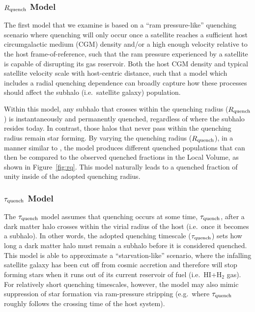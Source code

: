 \subsubsection{$R_{\rm quench}$ Model}
\label{subsubsec:rps}

The first model that we examine is based on a ``ram pressure-like'' quenching
scenario where quenching will only occur once a satellite reaches a sufficient
host circumgalactic medium (CGM) density and/or a high enough velocity relative
to the host frame-of-reference, such that the ram pressure experienced by a
satellite is capable of disrupting its gas reservoir.
%
Both the host CGM density and typical satellite velocity scale with host-centric
distance, such that a model which includes a radial quenching dependence can
broadly capture how these processes should affect the subhalo (i.e.~satellite
galaxy) population.
%




Within this model, any subhalo that crosses within the quenching radius
($R_{\rm quench}$) is instantaneously and permanently quenched, regardless of
where the subhalo resides today.
%
In contrast, those halos that never pass within the quenching radius remain
star forming.
%
By varying the quenching radius ($R_{\rm quench}$), in a manner similar to
\citet{fham15}, the model produces different quenched populations that can then
be compared to the observed quenched fractions in the Local Volume, as shown in
Figure~\ref{fig:rq}.
%
This model naturally leads to a quenched fraction of unity inside of the adopted
quenching radius.
%




\subsubsection{$\tau_{\rm quench}$ Model}
\label{subsubsec:starve}

The $\tau_{\rm quench}$ model assumes that quenching occurs at some time,
$\tau_{\rm quench}$, after a dark matter halo crosses within the virial radius of
the host (i.e.~once it becomes a subhalo).
%
In other words, the adopted quenching timescale ($\tau_{\rm quench}$) sets how
long a dark matter halo must remain a subhalo before it is considered quenched.
% 
This model is able to approximate a ``starvation-like'' scenario,
where the infalling satellite galaxy has been cut off from cosmic
accretion and therefore will stop forming stars when it runs out of
its current reservoir of fuel (i.e.~H{\scriptsize I}+H$_{2}$ gas). 
%
For relatively short quenching timescales, however, the model may also
mimic suppression of star formation via ram-pressure stripping
(e.g.~where $\tau_{\rm quench}$ roughly follows the crossing time of
the host system). 





